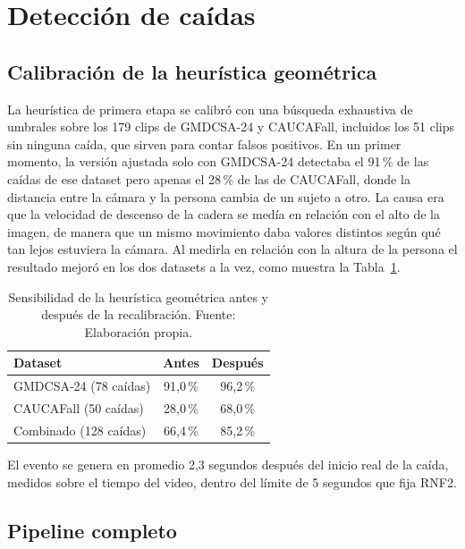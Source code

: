 \section{Detección de caídas}
\label{sec:pruebas_caidas}

\subsection{Calibración de la heurística geométrica}

La heurística de primera etapa se calibró con una búsqueda exhaustiva de umbrales sobre los 179 clips de GMDCSA-24 y CAUCAFall, incluidos los 51 clips sin ninguna caída, que sirven para contar falsos positivos.
En un primer momento, la versión ajustada solo con GMDCSA-24 detectaba el 91\,\% de las caídas de ese dataset pero apenas el 28\,\% de las de CAUCAFall, donde la distancia entre la cámara y la persona cambia de un sujeto a otro.
La causa era que la velocidad de descenso de la cadera se medía en relación con el alto de la imagen, de manera que un mismo movimiento daba valores distintos según qué tan lejos estuviera la cámara.
Al medirla en relación con la altura de la persona el resultado mejoró en los dos datasets a la vez, como muestra la Tabla~\ref{tab:caidas_calibracion}.

\begin{table}[H]
\centering
\caption[Sensibilidad de la heurística geométrica antes y después de la recalibración.]{Sensibilidad de la heurística geométrica antes y después de la recalibración. Fuente: Elaboración propia.}
\label{tab:caidas_calibracion}
\small
\begin{tabular}{@{}lcc@{}}
\toprule
\textbf{Dataset} & \textbf{Antes} & \textbf{Después} \\
\midrule
GMDCSA-24 (78 caídas) & 91,0\,\% & 96,2\,\% \\
CAUCAFall (50 caídas) & 28,0\,\% & 68,0\,\% \\
Combinado (128 caídas) & 66,4\,\% & 85,2\,\% \\
\bottomrule
\end{tabular}
\end{table}

El evento se genera en promedio 2,3 segundos después del inicio real de la caída, medidos sobre el tiempo del video, dentro del límite de 5 segundos que fija RNF2.

\subsection{Pipeline completo}

